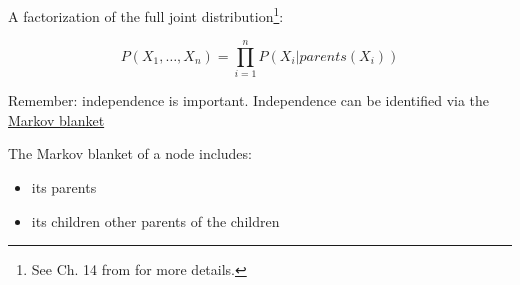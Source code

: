 	


\begin{frame}\frametitle{\secname}
    
A factorization of the full joint distribution\footnote{See Ch. 14 from \citep{russell2016artificial} for more details.}:

\begin{equation}
P(X_{1},\ldots,X_{n}) = \prod_{i=1}^{n} P(X_{i} | parents(X_{i}))
\end{equation}
    
Remember: independence is important. Independence can be identified via the 
\underline{Markov blanket}

The Markov blanket of a node includes:
\begin{itemize}
\item its parents
\item its children
other parents of the children    
\end{itemize}
    
\end{frame}

